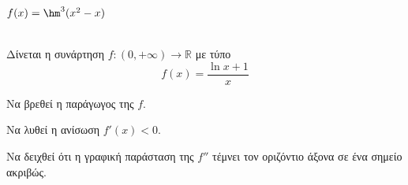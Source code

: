 \documentclass[twoside,nofonts,internet,math,spyros]{frontisthrio-diag}
\begin{document}
\begin{thema}
\begin{multicols}{2}
\begin{erwthma}
\item $ f(x)=\hm^3{(x^2-x)} $
\end{erwthma}
\end{multicols}
\item\mbox{}\\
Δίνεται η συνάρτηση $ f:(0,+\infty)\to\mathbb{R} $ με τύπο
\[ f(x)=\frac{\ln{x}+1}{x} \]
\begin{erwthma}
\item Να βρεθεί η παράγωγος της $ f $.
\item Να λυθεί η ανίσωση $ f'(x)<0 $.
\item Να δειχθεί ότι η γραφική παράσταση της $ f'' $ τέμνει τον οριζόντιο άξονα σε ένα σημείο ακριβώς.\\
\end{erwthma} 
\end{thema}
\end{document}
